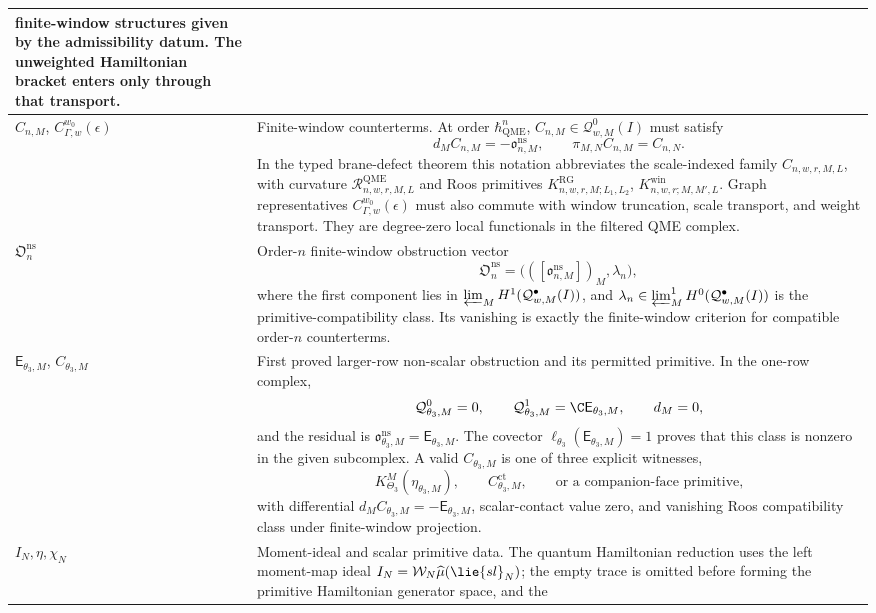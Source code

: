 \begin{longtable}{@{}>{\raggedright\arraybackslash}p{}
  >{\raggedright\arraybackslash}p{}@{}}
finite-window structures given by the admissibility datum.  The unweighted
Hamiltonian bracket enters only through that transport.\\
\hline
\(C_{n,M}\), \(C_{\Gamma,w}^{w_0}(\epsilon)\) &
Finite-window counterterms.  At order \(\hbar_{\mathrm{QME}}^n\),
\(C_{n,M}\in\mathcal Q^0_{w,M}(I)\) must satisfy
\[
  d_MC_{n,M}=-\mathfrak o^{\mathrm{ns}}_{n,M},
  \qquad
  \pi_{M,N}C_{n,M}=C_{n,N}.
\]
In the typed brane-defect theorem this notation abbreviates the
scale-indexed family \(C_{n,w,r,M,L}\), with curvature
\(\mathcal R^{\mathrm{QME}}_{n,w,r,M,L}\) and Roos primitives
\(K^{\mathrm{RG}}_{n,w,r,M;L_1,L_2}\),
\(K^{\mathrm{win}}_{n,w,r;M,M',L}\).  Graph representatives
\(C_{\Gamma,w}^{w_0}(\epsilon)\) must also commute with window
truncation, scale transport, and weight transport.  They are degree-zero
local functionals in the filtered QME complex.\\
\hline
\(\mathfrak O^{\mathrm{ns}}_n\) &
Order-\(n\) finite-window obstruction vector
\[
  \mathfrak O^{\mathrm{ns}}_n
  =
  \bigl(([\mathfrak o^{\mathrm{ns}}_{n,M}])_M,\lambda_n\bigr),
\]
where the first component lies in
\(\varprojlim_MH^1(\mathcal Q^\bullet_{w,M}(I))\), and
\(\lambda_n\in\varprojlim\nolimits^1_M
H^0(\mathcal Q^\bullet_{w,M}(I))\) is the primitive-compatibility class.
Its vanishing is exactly the finite-window criterion for compatible
order-\(n\) counterterms.\\
\hline
\(\mathsf E_{\theta_3,M}\), \(C_{\theta_3,M}\) &
First proved larger-row non-scalar obstruction and its permitted
primitive.  In the one-row complex,
\[
  \mathcal Q^0_{\theta_3,M}=0,\qquad
  \mathcal Q^1_{\theta_3,M}=\C\mathsf E_{\theta_3,M},\qquad
  d_M=0,
\]
and the residual is \(\mathfrak o^{\mathrm{ns}}_{\theta_3,M}
=\mathsf E_{\theta_3,M}\).  The covector
\(\ell_{\theta_3}(\mathsf E_{\theta_3,M})=1\) proves that this class is
nonzero in the given subcomplex.  A valid \(C_{\theta_3,M}\) is one of
three explicit witnesses,
\[
  K^M_{\Theta_3}(\eta_{\theta_3,M}),\qquad
  C^{\mathrm{ct}}_{\theta_3,M},\qquad
  \text{or a companion-face primitive,}
\]
with differential \(d_MC_{\theta_3,M}=-\mathsf E_{\theta_3,M}\),
scalar-contact value zero, and vanishing Roos compatibility class under
finite-window projection.\\
\hline
\(I_N,\eta,\chi_N\) &
Moment-ideal and scalar primitive data.  The quantum Hamiltonian
reduction uses the left moment-map ideal
\(I_N=\mathcal W_N\widehat\mu(\lie{sl}_N)\); the empty trace is omitted
before forming the primitive Hamiltonian generator space, and the

\end{longtable}
